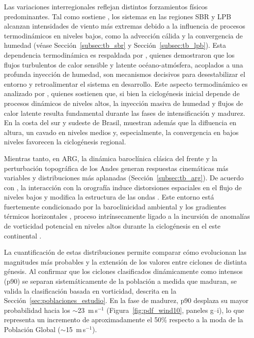 Las variaciones interregionales reflejan distintos forzamientos físicos predominantes. 
Tal como sostiene \citet{gramcianinov2024early}, los sistemas en las regiones SBR y LPB alcanzan intensidades de viento más extremas debido a la influencia de procesos termodinámicos en niveles bajos, como la advección cálida y la convergencia de humedad (véase Sección~\ref{subsec:tb_sbr} y Sección~\ref{subsec:tb_lpb}).
Esta dependencia termodinámica es respaldada por \citet{gozzo2013air}, quienes demostraron que los flujos turbulentos de calor sensible y latente océano-atmósfera, acoplados a una profunda inyección de humedad, son mecanismos decisivos para desestabilizar el entorno y retroalimentar el sistema en desarrollo.
Este aspecto termodinámico es analizado por \citet{russo2025impacts}, quienes sostienen que, si bien la ciclogénesis inicial depende de procesos dinámicos de niveles altos, la inyección masiva de humedad y flujos de calor latente resulta fundamental durante las fases de intensificación y madurez.
En la costa del sur y sudeste de Brasil, \citet{rocha2016estudio} muestran además que la difluencia en altura, un cavado en niveles medios y, especialmente, la convergencia en bajos niveles favorecen la ciclogénesis regional.

Mientras tanto, en ARG, la dinámica baroclínica clásica del frente y la perturbación topográfica de los Andes generan respuestas cinemáticas más variables y distribuciones más aplanadas (Sección~\ref{subsec:tb_arg}). 
De acuerdo con \citet{gan1994influence}, la interacción con la orografía induce distorsiones espaciales en el flujo de niveles bajos y modifica la estructura de las ondas \citep{vera2002cold}. Este entorno está fuertemente condicionado por la baroclinicidad ambiental y los gradientes térmicos horizontales \citep{yanase2014parameter}, proceso intrínsecamente ligado a la incursión de anomalías de vorticidad potencial en niveles altos durante la ciclogénesis en el este continental \citep{crespo2020potential, gramcianinov2019properties}.

La cuantificación de estas distribuciones permite comparar cómo evolucionan las magnitudes más probables y la extensión de los valores entre ciclones de distinta génesis. 
Al confirmar que los ciclones clasificados dinámicamente como intensos (p90) se separan sistemáticamente de la población a medida que maduran, se valida la clasificación basada en vorticidad, descrita en la Sección~\ref{sec:poblaciones_estudio}. 
En la fase de madurez, p90 desplaza su mayor probabilidad hacia los $\sim$23~m\,s$^{-1}$ (Figura~\ref{fig:pdf_wind10}, paneles g--i), lo que representa un incremento de aproximadamente el 50\% respecto a la moda de la Población Global ($\sim$15~m\,s$^{-1}$).

